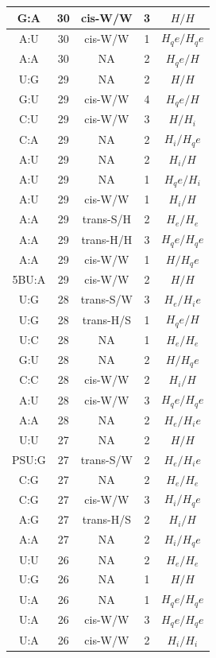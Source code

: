 \begin{center}
\begin{longtable}{c|c|c|c|c}
G:A & 30 & cis-W/W & 3 & $H/H$ \\  \hline
A:U & 30 & cis-W/W & 1 & $H_qe/H_qe$ \\  \hline
A:A & 30 & NA & 2 & $H_qe/H$ \\  \hline
U:G & 29 & NA & 2 & $H/H$ \\  \hline
G:U & 29 & cis-W/W & 4 & $H_qe/H$ \\  \hline
C:U & 29 & cis-W/W & 3 & $H/H_i$ \\  \hline
C:A & 29 & NA & 2 & $H_i/H_qe$ \\  \hline
A:U & 29 & NA & 2 & $H_i/H$ \\  \hline
A:U & 29 & NA & 1 & $H_qe/H_i$ \\  \hline
A:U & 29 & cis-W/W & 1 & $H_i/H$ \\  \hline
A:A & 29 & trans-S/H & 2 & $H_e/H_e$ \\  \hline
A:A & 29 & trans-H/H & 3 & $H_qe/H_qe$ \\  \hline
A:A & 29 & cis-W/W & 1 & $H/H_qe$ \\  \hline
5BU:A & 29 & cis-W/W & 2 & $H/H$ \\  \hline
U:G & 28 & trans-S/W & 3 & $H_e/H_ie$ \\  \hline
U:G & 28 & trans-H/S & 1 & $H_qe/H$ \\  \hline
U:C & 28 & NA & 1 & $H_e/H_e$ \\  \hline
G:U & 28 & NA & 2 & $H/H_qe$ \\  \hline
C:C & 28 & cis-W/W & 2 & $H_i/H$ \\  \hline
A:U & 28 & cis-W/W & 3 & $H_qe/H_qe$ \\  \hline
A:A & 28 & NA & 2 & $H_e/H_ie$ \\  \hline
U:U & 27 & NA & 2 & $H/H$ \\  \hline
PSU:G & 27 & trans-S/W & 2 & $H_e/H_ie$ \\  \hline
C:G & 27 & NA & 2 & $H_e/H_e$ \\  \hline
C:G & 27 & cis-W/W & 3 & $H_i/H_qe$ \\  \hline
A:G & 27 & trans-H/S & 2 & $H_i/H$ \\  \hline
A:A & 27 & NA & 2 & $H_i/H_qe$ \\  \hline
U:U & 26 & NA & 2 & $H_e/H_e$ \\  \hline
U:G & 26 & NA & 1 & $H/H$ \\  \hline
U:A & 26 & NA & 1 & $H_qe/H_qe$ \\  \hline
U:A & 26 & cis-W/W & 3 & $H_qe/H_qe$ \\  \hline
U:A & 26 & cis-W/W & 2 & $H_i/H_i$ \\  \hline

\end{longtable}
\end{center}
